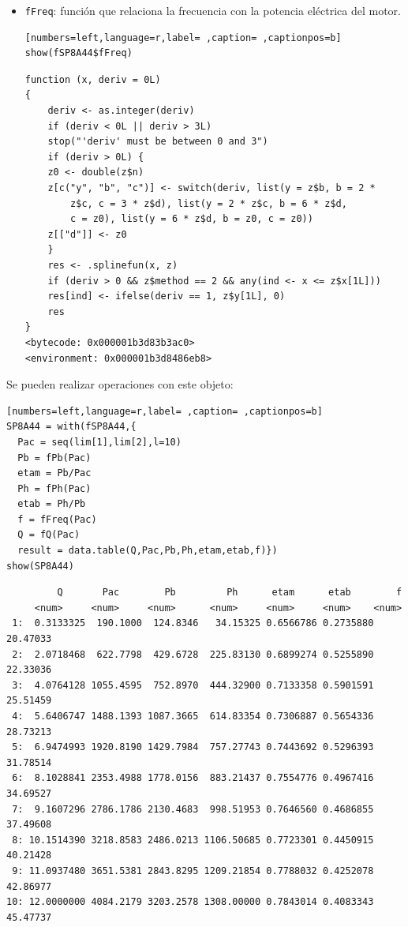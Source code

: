 \begin{itemize}
\begin{itemize}
\item \texttt{fFreq}: función que relaciona la frecuencia con la potencia eléctrica del motor.
\begin{lstlisting}[numbers=left,language=r,label= ,caption= ,captionpos=b]
show(fSP8A44$fFreq)
\end{lstlisting}

\begin{verbatim}
function (x, deriv = 0L) 
{
    deriv <- as.integer(deriv)
    if (deriv < 0L || deriv > 3L) 
	stop("'deriv' must be between 0 and 3")
    if (deriv > 0L) {
	z0 <- double(z$n)
	z[c("y", "b", "c")] <- switch(deriv, list(y = z$b, b = 2 * 
	    z$c, c = 3 * z$d), list(y = 2 * z$c, b = 6 * z$d, 
	    c = z0), list(y = 6 * z$d, b = z0, c = z0))
	z[["d"]] <- z0
    }
    res <- .splinefun(x, z)
    if (deriv > 0 && z$method == 2 && any(ind <- x <= z$x[1L])) 
	res[ind] <- ifelse(deriv == 1, z$y[1L], 0)
    res
}
<bytecode: 0x000001b3d83b3ac0>
<environment: 0x000001b3d8486eb8>
\end{verbatim}
\end{itemize}

Se pueden realizar operaciones con este objeto:
\begin{lstlisting}[numbers=left,language=r,label= ,caption= ,captionpos=b]
SP8A44 = with(fSP8A44,{
  Pac = seq(lim[1],lim[2],l=10)
  Pb = fPb(Pac)
  etam = Pb/Pac
  Ph = fPh(Pac)
  etab = Ph/Pb
  f = fFreq(Pac)
  Q = fQ(Pac)
  result = data.table(Q,Pac,Pb,Ph,etam,etab,f)})
show(SP8A44)
\end{lstlisting}

\begin{verbatim}
	     Q       Pac        Pb         Ph      etam      etab        f
	 <num>     <num>     <num>      <num>     <num>     <num>    <num>
 1:  0.3133325  190.1000  124.8346   34.15325 0.6566786 0.2735880 20.47033
 2:  2.0718468  622.7798  429.6728  225.83130 0.6899274 0.5255890 22.33036
 3:  4.0764128 1055.4595  752.8970  444.32900 0.7133358 0.5901591 25.51459
 4:  5.6406747 1488.1393 1087.3665  614.83354 0.7306887 0.5654336 28.73213
 5:  6.9474993 1920.8190 1429.7984  757.27743 0.7443692 0.5296393 31.78514
 6:  8.1028841 2353.4988 1778.0156  883.21437 0.7554776 0.4967416 34.69527
 7:  9.1607296 2786.1786 2130.4683  998.51953 0.7646560 0.4686855 37.49608
 8: 10.1514390 3218.8583 2486.0213 1106.50685 0.7723301 0.4450915 40.21428
 9: 11.0937480 3651.5381 2843.8295 1209.21854 0.7788032 0.4252078 42.86977
10: 12.0000000 4084.2179 3203.2578 1308.00000 0.7843014 0.4083343 45.47737
\end{verbatim}


\end{itemize}
